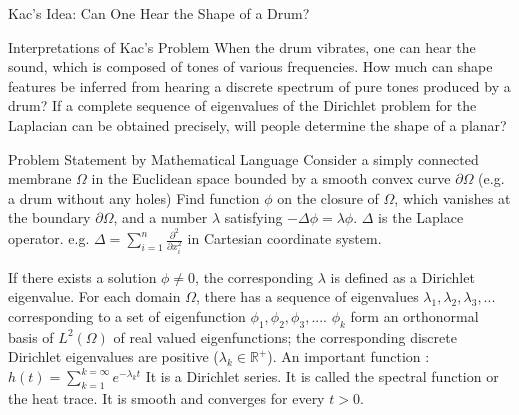 \documentclass{article}
\begin{document}
\begin{outline}[enumerate]


  \1 Kac’s Idea: Can One Hear the Shape of a Drum? \cite{kac1966can}
  
    \2 Interpretations of Kac's Problem
      \3 When the drum vibrates, one can hear the sound, which is composed of tones of various frequencies. How much can shape features be inferred from hearing a discrete spectrum of pure tones produced by a drum?
      \3 If a complete sequence of eigenvalues of the Dirichlet problem for the Laplacian can be obtained precisely, will people determine the shape of a planar?
      
    \2 Problem Statement by Mathematical Language
      \3 Consider a simply connected membrane $\Omega$ in the Euclidean space bounded by a smooth convex curve $\partial \Omega$ (e.g. a drum without any holes)
      \3 Find function $\phi$ on the closure of $\Omega$, which vanishes at the boundary $\partial \Omega$, and a number $\lambda$ satisfying $-\Delta \phi = \lambda \phi$.
        \4 $\Delta$ is the Laplace operator. e.g. $\Delta = \sum_{i=1}^{n} \frac{\partial ^2}{\partial x_i^2}$ in Cartesian coordinate system.
        
        \4 If there exists a solution $\phi \neq 0$, the corresponding $\lambda$ is defined as a Dirichlet eigenvalue.
        \4 For each domain $\Omega$, there has a sequence of eigenvalues $\lambda_1, \lambda_2, \lambda_3, ... $ corresponding to a set of eigenfunction $\phi_1, \phi_2, \phi_3, ...$.
        \4 $\phi_k$ form an orthonormal basis of $L^2(\Omega)$ of real valued eigenfunctions; the corresponding discrete Dirichlet eigenvalues are positive ($\lambda_k \in \mathbb{R^{+}}$).
      \3 An important function \cite{grieser2013hearing}: $h(t) = \sum_{k=1}^{k=\infty} e^{-\lambda_kt}$
        \4 It is a Dirichlet series.
        \4 It is called the spectral function or the heat trace.
        \4 It is smooth and converges for every $t>0$.


\end{outline}
\end{document}
